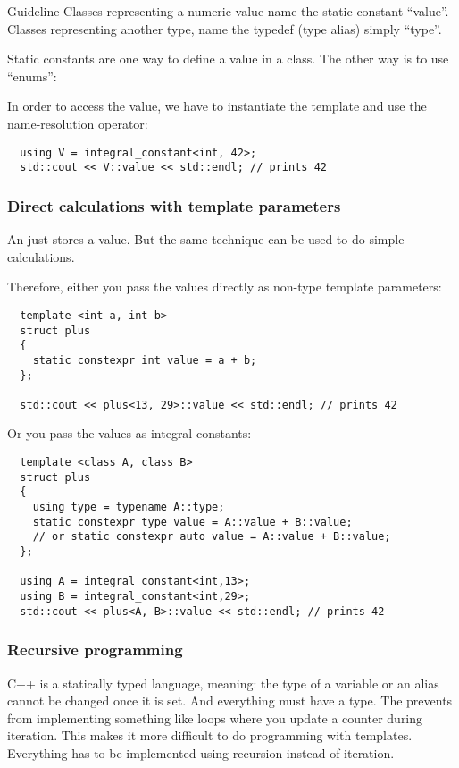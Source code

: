 \begin{guideline}{Guideline}
  Classes representing a numeric value name the static constant ``value''. Classes representing another type, name the typedef (type alias) simply ``type''.
\end{guideline}

\begin{rem}
Static  constants are one way to define a value in a class. The other way is to use ``enums'':
\end{rem}

In order to access the value, we have to instantiate the template and use the name-resolution operator:
\begin{verbatim}
  using V = integral_constant<int, 42>;
  std::cout << V::value << std::endl; // prints 42
\end{verbatim}

\subsubsection{Direct calculations with template parameters}
An  just stores a value. But the same technique can be used to do simple calculations.

Therefore, either you pass the values directly as non-type template parameters:
\begin{verbatim}
  template <int a, int b>
  struct plus
  {
    static constexpr int value = a + b;
  };

  std::cout << plus<13, 29>::value << std::endl; // prints 42
\end{verbatim}

Or you pass the values as integral constants:
\begin{verbatim}
  template <class A, class B>
  struct plus
  {
    using type = typename A::type;
    static constexpr type value = A::value + B::value;
    // or static constexpr auto value = A::value + B::value;
  };

  using A = integral_constant<int,13>;
  using B = integral_constant<int,29>;
  std::cout << plus<A, B>::value << std::endl; // prints 42
\end{verbatim}

\subsubsection{Recursive programming}
C++ is a statically typed language, meaning: the type of a variable or an alias cannot be changed once it is set. And everything must
have a type. The prevents from implementing something like loops where you update a counter during iteration. This makes it more
difficult to do programming with templates. Everything has to be implemented using recursion instead of iteration.

